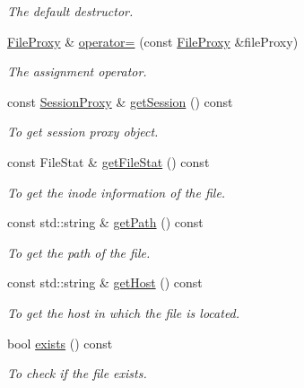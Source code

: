 \begin{DoxyCompactItemize}
\begin{DoxyCompactList}\small\item\em The default destructor. \item\end{DoxyCompactList}\item 
\hyperlink{classFileProxy}{FileProxy} \& \hyperlink{classFileProxy_a82a989c92c4c244b9ae367bb12ba06af}{operator=} (const \hyperlink{classFileProxy}{FileProxy} \&fileProxy)
\begin{DoxyCompactList}\small\item\em The assignment operator. \item\end{DoxyCompactList}\item 
const \hyperlink{classSessionProxy}{SessionProxy} \& \hyperlink{classFileProxy_a02c8776b5ba371e770dcf4abef926917}{getSession} () const 
\begin{DoxyCompactList}\small\item\em To get session proxy object. \item\end{DoxyCompactList}\item 
const FileStat \& \hyperlink{classFileProxy_ab410537a3511fc271e95873446e591e9}{getFileStat} () const 
\begin{DoxyCompactList}\small\item\em To get the inode information of the file. \item\end{DoxyCompactList}\item 
const std::string \& \hyperlink{classFileProxy_a6f1d950939d43c63f80f81341e6b1edf}{getPath} () const 
\begin{DoxyCompactList}\small\item\em To get the path of the file. \item\end{DoxyCompactList}\item 
const std::string \& \hyperlink{classFileProxy_a9b37a8d49f1e1bfd269f1d9aee1c6b54}{getHost} () const 
\begin{DoxyCompactList}\small\item\em To get the host in which the file is located. \item\end{DoxyCompactList}\item 
bool \hyperlink{classFileProxy_a3dff8895dfc3897bc65f418fa066f709}{exists} () const 
\begin{DoxyCompactList}\small\item\em To check if the file exists. \item\end{DoxyCompactList}\item 

\end{DoxyCompactItemize}
